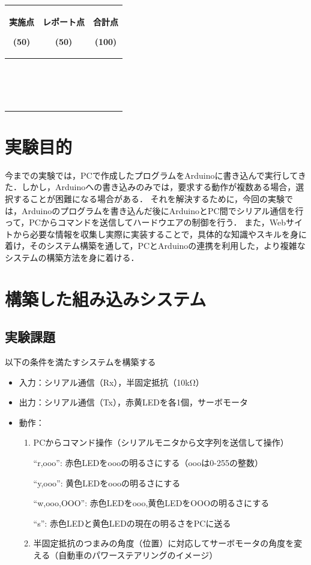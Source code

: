 \documentclass{ltjsarticle}
\begin{document}
\begin{center}
    \begin{tabularx}{100mm}{|C|C|C|} \hline
        実施点\par(50) & レポート点\par(50) & 合計点\par(100) \\ \hline
        \ \par\ \par & & \\ \hline
    \end{tabularx}
\end{center}

\newpage
\section{実験目的}

今までの実験では，PCで作成したプログラムをArduinoに書き込んで実行してきた．しかし，Arduinoへの書き込みのみでは，要求する動作が複数ある場合，選択することが困難になる場合がある．
それを解決するために，今回の実験では，Arduinoのプログラムを書き込んだ後にArduinoとPC間でシリアル通信を行って，PCからコマンドを送信してハードウエアの制御を行う．
また，Webサイトから必要な情報を収集し実際に実装することで，具体的な知識やスキルを身に着け，そのシステム構築を通して，PCとArduinoの連携を利用した，より複雑なシステムの構築方法を身に着ける．


\section{構築した組み込みシステム}
\subsection{実験課題}
以下の条件を満たすシステムを構築する
\begin{itemize}
    \item 入力：シリアル通信（Rx），半固定抵抗（10kΩ）
    \item 出力：シリアル通信（Tx），赤黄LEDを各1個，サーボモータ
    \item 動作：\begin{enumerate}
        \item PCからコマンド操作（シリアルモニタから文字列を送信して操作）

        “r,ooo”: 赤色LEDをoooの明るさにする（oooは0-255の整数）

        “y,ooo”: 黄色LEDをoooの明るさにする 

        “w,ooo,OOO”: 赤色LEDをooo,黄色LEDをOOOの明るさにする 

        “s”: 赤色LEDと黄色LEDの現在の明るさをPCに送る
        \item 半固定抵抗のつまみの角度（位置）に対応してサーボモータの角度を変える（自動車のパワーステアリングのイメージ）
    \end{enumerate}
\end{itemize}
\end{document}
